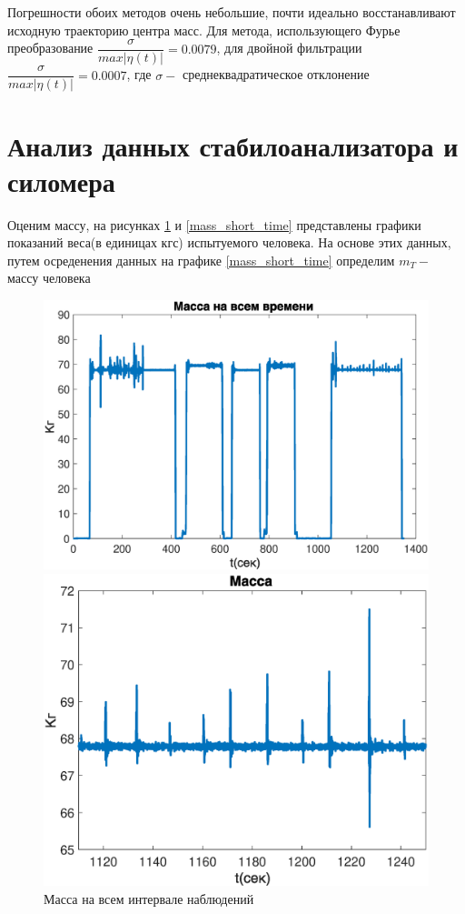 \documentclass[a4paper,12pt, openany]{book}
\theoremstyle{plain} %
\theoremstyle{definition} %
\theoremstyle{remark} %
\numberwithin{equation}{chapter}
\begin{document}
{Погрешности обоих методов очень небольшие, почти идеально восстанавливают исходную
траекторию центра масс. Для метода, использующего Фурье преобразование
$\dfrac{\sigma}{max|\eta(t)|}=0.0079$, для двойной фильтрации $\dfrac{\sigma}{max|\eta(t)|}=0.0007$, где $\sigma-$ среднеквадратическое отклонение

\section{Анализ данных стабилоанализатора и силомера}
Оценим массу, на рисунках \ref{mass_full_time} и
\ref{mass_short_time} представлены графики показаний веса(в единицах кгс) испытуемого человека.
 На основе этих данных, путем осреденения данных на графике \ref{mass_short_time} определим $m_T -$ массу человека 

\begin{figure}[h!]
    \begin{center}
        \begin{minipage}[h]{0.49\linewidth}
            \includegraphics[width=1\linewidth]{mass_full_time.eps}
            \caption{Масса на всем интервале наблюдений}
            \label{mass_full_time}
        \end{minipage}
        \hfill
        \begin{minipage}[h]{0.49\linewidth}
            \includegraphics[width=1\linewidth]{mass_concrete.eps}

\end{minipage}
\end{center}
\end{figure}}
\end{document}
